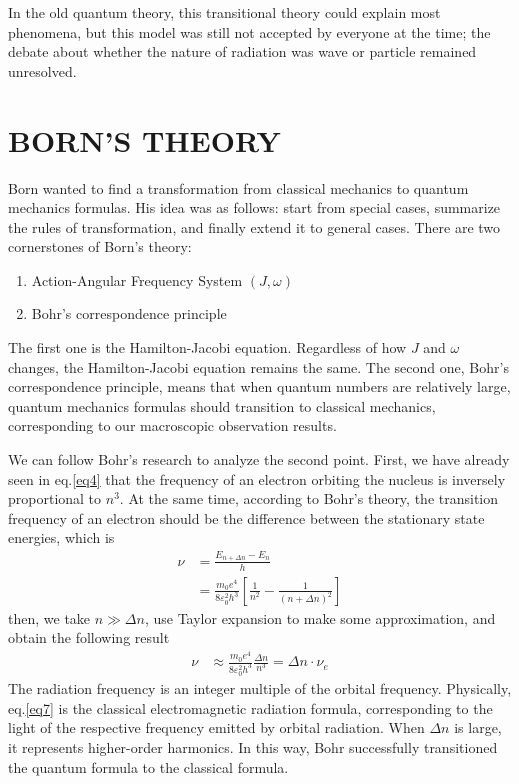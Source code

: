 \documentclass[a4paper, 12pt, oneside, onecolumn]{article}
\begin{document}
\begin{multicols}{2}
In the old quantum theory\cite{Kuhn_1968}, this transitional theory could explain most phenomena, but this model was still not accepted by everyone at the time; the debate about whether the nature of radiation was wave or particle remained unresolved.


\section{BORN'S THEORY}
Born wanted to find a transformation from classical mechanics to quantum mechanics formulas. His idea was as follows: start from special cases, summarize the rules of transformation, and finally extend it to general cases. There are two cornerstones of Born's theory:
\begin{enumerate}
	\item Action-Angular Frequency System $(J, \omega)$
	\item Bohr's correspondence principle\cite{nielsen2013correspondence}
\end{enumerate}
The first one is the Hamilton-Jacobi equation. Regardless of how $J$ and $\omega$ changes, the Hamilton-Jacobi equation remains the same. The second one, Bohr's correspondence principle, means that when quantum numbers are relatively large, quantum mechanics formulas should transition to classical mechanics, corresponding to our macroscopic observation results.

We can follow Bohr's research to analyze the second point. First, we have already seen in eq.\ref{eq4} that the frequency of an electron orbiting the nucleus is inversely proportional to $n^3$. At the same time, according to Bohr's theory, the transition frequency of an electron should be the difference between the stationary state energies, which is
\begin{align}
	\nu
	&= \frac{E_{n + \Delta n} - E_{n}}{h} \\
	&= \frac{m_0 e^4}{8 \varepsilon_0^2 h^3} \left[ \frac{1}{n^2} - \frac{1}{\left( n + \Delta n \right)^2 } \right]
\end{align}
then, we take $n \gg \Delta n$, use Taylor expansion to make some approximation, and obtain the following result
\begin{align}
	\nu
	&\approx \frac{m_0 e^4}{8 \varepsilon_0^2 h^3} \frac{\Delta n}{n^3} = \Delta n \cdot \nu_e \label{eq7}
\end{align}
The radiation frequency is an integer multiple of the orbital frequency. Physically, eq.\ref{eq7} is the classical electromagnetic radiation formula, corresponding to the light of the respective frequency emitted by orbital radiation. When $\Delta n$ is large, it represents higher-order harmonics. In this way, Bohr successfully transitioned the quantum formula to the classical formula.


\end{multicols}
\end{document}
